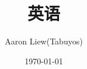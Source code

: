 \documentclass[UTF8,fontset=ubuntu]{ctexart}
\begin{document}
\title{英语}
\author{Aaron Liew(Tabuyos)}
\date{\today}
\maketitle


\end{document}
